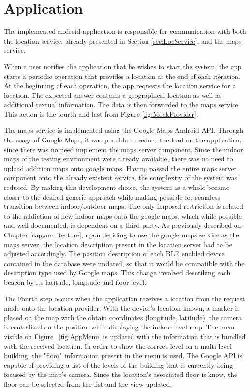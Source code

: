 \section{Application} 
\label{sec:app} 
 
 
The implemented android application is responsible for communication with both the location service, already presented in Section \ref{sec:LocService}, and the maps service. 
 
 
When a user notifies the application that he wishes to start the system, the app starts a periodic operation that provides a location at the end of each iteration. At the beginning of each operation, the app requests the location service for a location. The expected answer contains a geographical location as well as additional  textual information. The data is then forwarded to the maps service. This action is the fourth and last from Figure \ref{fig:MockProvider}. 
 
 
The maps service is implemented using the Google Maps Android API. Through the usage of Google Maps, it was possible to reduce the load on the application, since there was no need implement the maps server component. Since the indoor maps of the testing environment were already available, there was no need to upload addition maps onto google maps. Having passed the entire maps server component onto the already existent service, the complexity of the system was reduced. By making this development choice, the system as a whole became closer to the desired generic approach while making possible for seamless transition between indoor/outdoor maps. The only imposed restriction is related to the addiction of new indoor maps onto the google maps, which while possible and well documented, is dependent on a third party. As previously described on Chapter \ref{cap:architecture}, upon deciding to use the google maps service as the maps server, the location description present in the location server had to be adjusted accordingly. The position description of each \ac{BLE} enabled device contained in the database were updated, so that it would be compatible with the description type used by Google maps. This change involved describing each beacon by its latitude, longitude and floor level. 
 
 
The Fourth step occurs when the application receives a location from the request made onto the location provider. With the device's location known, a marker is placed on the map with the obtain coordinates (longitude, latitude), the camera is centralised on the position while displaying the indoor level map. The menu visible on Figure ~\ref{fig:AppMenu} is updated with the information that is bundled with the received location. In order to show the correct level on a multi level building, the "floor" information present in the menu is used. The Google API is capable of providing a list of the levels of the building that is currently being focused by the map's camera. Since the location's associated floor is know, the floor can be selected from the list and the view updated. 
 

